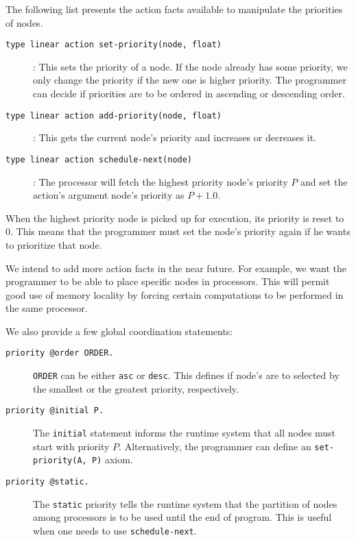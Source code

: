 The following list presents the action facts available to manipulate the priorities of nodes.

\begin{description}
   \item[\texttt{type linear action set-priority(node, float)}]: This sets the priority of a node. If the node already has some priority, we only change the priority if the new one is higher priority. The programmer can decide if priorities are to be ordered in ascending or descending order.
   \item[\texttt{type linear action add-priority(node, float)}]: This gets the current node's priority and increases or decreases it.
   \item[\texttt{type linear action schedule-next(node)}]: The processor will fetch the highest priority node's priority $P$ and set the action's argument node's priority as $P + 1.0$.
\end{description}

When the highest priority node is picked up for execution, its priority is reset to 0. This means that
the programmer must set the node's priority again if he wants to prioritize that node.

We intend to add more action facts in the near future. For example, we want the programmer to be able to place specific nodes in processors. This will permit good use of
memory locality by forcing certain computations to be performed in the same processor.

We also provide a few global coordination statements:

\begin{description}
   \item[\texttt{priority @order ORDER.}] \texttt{ORDER} can be either \texttt{asc} or \texttt{desc}. This defines if node's are to selected by the smallest or the greatest priority, respectively.
   \item[\texttt{priority @initial P.}] The \texttt{initial} statement informs the runtime system that all nodes must start with priority $P$. Alternatively, the programmer can define an \texttt{set-priority(A, P)} axiom.
   \item[\texttt{priority @static.}] The \texttt{static} priority tells the runtime system that the partition of nodes among processors is to be used until the end of program. This is useful when one needs to use \texttt{schedule-next}.
\end{description}


